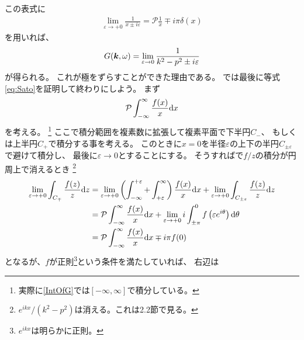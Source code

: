 \documentclass[a4paper, 10pt]{jsarticle}
\theoremstyle{definition}
\def\vec#1{\mbox{\boldmath $#1$}}
\newcommand{\ddif}{{\rm d}}
\begin{document}
この表式に
\begin{align}
	\lim_{\varepsilon \to +0} \frac{1}{x \pm i\varepsilon}
	= \mathcal{P} \frac{1}{x} \mp i\pi \delta(x)
	\label{eq:Sato}
\end{align}
を用いれば、
\begin{align}
	G(\vec{k}, \omega)
	= \lim_{\varepsilon \to 0} \frac{1}{k^2 - p^2 \pm i\varepsilon}
\end{align}
が得られる。
これが極をずらすことができた理由である。
では最後に等式\eqref{eq:Sato}を証明して終わりにしよう。
まず
\begin{align}
	\mathcal{P} \int_{-\infty}^{\infty} \frac{f(x)}{x} \ddif x
\end{align}
を考える。
\footnote{実際に\eqref{IntOfG}では$[-\infty, \infty]$で積分している。}
ここで積分範囲を複素数に拡張して複素平面で下半円$C_-$、
もしくは上半円$C_+$で積分する事を考える。
このときに$x=0$を半径$\varepsilon$の上下の半円$C_{\pm \varepsilon}$で避けて積分し、
最後に$\varepsilon \to 0$とすることにする。
そうすればで$f/z$の積分が円周上で消えるとき
\footnote{$e^{ikx}/(k^2-p^2)$は消える。これは2.2節で見る。}
\begin{align}
	\lim_{\varepsilon \to +0} \int_{C_\mp} \frac{f(z)}{z} \ddif z
	&= \lim_{\varepsilon \to +0}
	\left( \int_{-\infty}^{+\varepsilon} + \int_{+\varepsilon}^{\infty} \right)
	\frac{f(x)}{x} \ddif x
	+ \lim_{\varepsilon \to +0}
	\int_{C_{\pm \varepsilon}} \frac{f(z)}{z} \ddif z \\
	&= \mathcal{P} \int_{-\infty}^{\infty} \frac{f(x)}{x} \ddif x
	+ \lim_{\varepsilon \to +0} i
	\int_{\pm \pi}^{0} f\left( \varepsilon e^{i \theta} \right) \ddif \theta \\
	&= \mathcal{P} \int_{-\infty}^{\infty} \frac{f(x)}{x} \ddif x
	\mp i\pi f(0)
\end{align}
となるが、$f$が正則\footnote{$e^{ikx}$は明らかに正則。}という条件を満たしていれば、
右辺は
\end{document}
